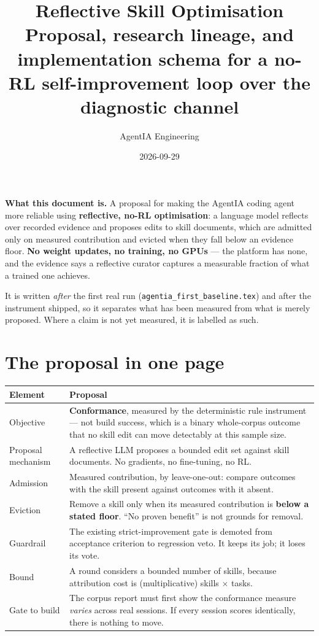 \documentclass[11pt,a4paper]{article}
\title{\vspace{-1.4cm}\textbf{Reflective Skill Optimisation}\\[0.25cm]
\large Proposal, research lineage, and implementation schema for a no-RL
self-improvement loop over the diagnostic channel}
\author{AgentIA Engineering}
\date{2026-09-29}
\begin{document}
\maketitle
\thispagestyle{fancy}

\begin{notebox}
\textbf{What this document is.} A proposal for making the AgentIA coding agent
more reliable using \textbf{reflective, no-RL optimisation}: a language model
reflects over recorded evidence and proposes edits to skill documents, which are
admitted only on measured contribution and evicted when they fall below an
evidence floor. \textbf{No weight updates, no training, no GPUs} --- the platform
has none, and the evidence says a reflective curator captures a measurable
fraction of what a trained one achieves.

It is written \emph{after} the first real run
(\texttt{agentia\_first\_baseline.tex}) and after the instrument shipped, so it
separates what has been measured from what is merely proposed. Where a claim is
not yet measured, it is labelled as such.
\end{notebox}

\tableofcontents
\vspace{0.5cm}

\section{The proposal in one page}

\begin{center}
\begin{tabular}{@{}p{}p{}@{}}
\toprule
\textbf{Element} & \textbf{Proposal} \\
\midrule
Objective & \textbf{Conformance}, measured by the deterministic rule instrument ---
not build success, which is a binary whole-corpus outcome that no skill edit can
move detectably at this sample size. \\
Proposal mechanism & A reflective LLM proposes a bounded edit set against skill
documents. No gradients, no fine-tuning, no RL. \\
Admission & Measured contribution, by leave-one-out: compare outcomes with the
skill present against outcomes with it absent. \\
Eviction & Remove a skill only when its measured contribution is \textbf{below a
stated floor}. ``No proven benefit'' is not grounds for removal. \\
Guardrail & The existing strict-improvement gate is demoted from acceptance
criterion to regression veto. It keeps its job; it loses its vote. \\
Bound & A round considers a bounded number of skills, because attribution cost is
(multiplicative) skills $\times$ tasks. \\
Gate to build & The corpus report must first show the conformance measure
\emph{varies} across real sessions. If every session scores identically, there is
nothing to move. \\
\bottomrule
\end{tabular}
\end{center}
\end{document}
